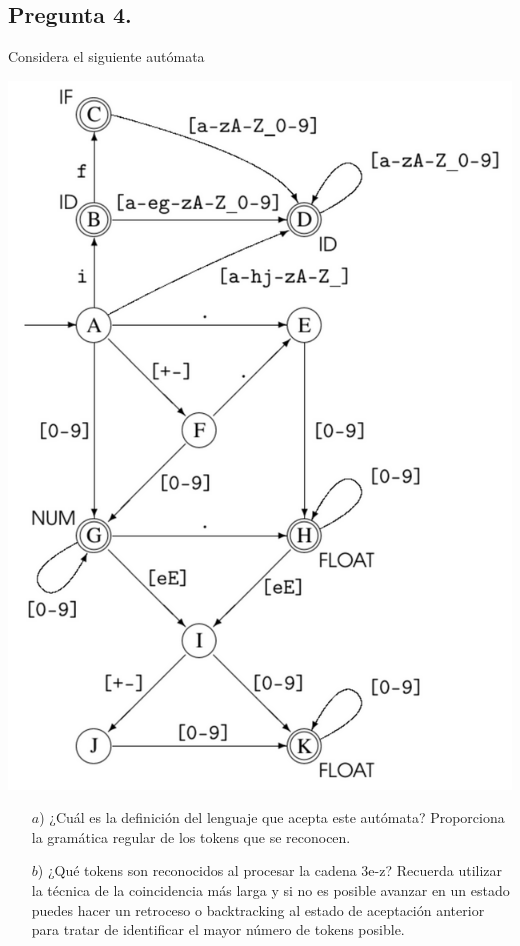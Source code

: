 \subsection*{Pregunta 4.}
Considera el siguiente autómata
\begin{multicols}{2}
\begin{center}
  \includegraphics[scale=0.30]{./Automata.png}
\end{center}

\begin{itemize}
\item[$a$)] ¿Cuál es la definición del lenguaje que acepta este autómata?
  Proporciona la gramática regular de los tokens que se reconocen.
\item[$b$)] ¿Qué tokens son reconocidos al procesar la cadena 3e-z? Recuerda
  utilizar la técnica de la coincidencia más larga y si no es posible avanzar
  en un estado puedes hacer un retroceso o backtracking al estado de aceptación
  anterior para tratar de identificar el mayor número de tokens posible.
\end{itemize}
\end{multicols}

